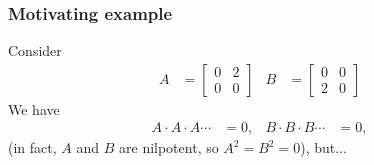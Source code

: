\documentclass{beamer}
\begin{document}
  \begin{frame}
      \frametitle{Motivating example}
      Consider
      \begin{align*}
          A & =
          \begin{bmatrix}
              0 & 2\\
              0 & 0
          \end{bmatrix}&
          B & =
          \begin{bmatrix}
              0 & 0\\
              2 & 0
          \end{bmatrix}
      \end{align*}
      We have
      \begin{align*}
        A \cdot A \cdot A \cdots & = 0,&
        B \cdot B \cdot B \cdots & = 0,
      \end{align*}
      (in fact, $A$ and $B$ are \alert{nilpotent}, so $A^2 = B^2 = 0$), but...
  \end{frame}
\end{document}
